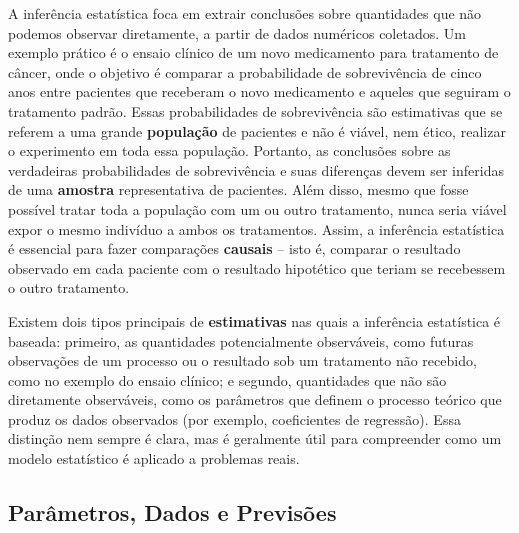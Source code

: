 A inferência estatística foca em extrair conclusões sobre quantidades que não podemos observar diretamente, a partir de dados numéricos coletados. Um exemplo prático é o ensaio clínico de um novo medicamento para tratamento de câncer, onde o objetivo é comparar a probabilidade de sobrevivência de cinco anos entre pacientes que receberam o novo medicamento e aqueles que seguiram o tratamento padrão. Essas probabilidades de sobrevivência são estimativas que se referem a uma grande \textbf{população} de pacientes e não é viável, nem ético, realizar o experimento em toda essa população. Portanto, as conclusões sobre as verdadeiras probabilidades de sobrevivência e suas diferenças devem ser inferidas de uma \textbf{amostra} representativa de pacientes. Além disso, mesmo que fosse possível tratar toda a população com um ou outro tratamento, nunca seria viável expor o mesmo indivíduo a ambos os tratamentos. Assim, a inferência estatística é essencial para fazer comparações \textbf{causais} -- isto é, comparar o resultado observado em cada paciente com o resultado hipotético que teriam se recebessem o outro tratamento.

Existem dois tipos principais de \textbf{estimativas} nas quais a inferência estatística é baseada: primeiro, as quantidades potencialmente observáveis, como futuras observações de um processo ou o resultado sob um tratamento não recebido, como no exemplo do ensaio clínico; e segundo, quantidades que não são diretamente observáveis, como os parâmetros que definem o processo teórico que produz os dados observados (por exemplo, coeficientes de regressão). Essa distinção nem sempre é clara, mas é geralmente útil para compreender como um modelo estatístico é aplicado a problemas reais.

\subsection{Parâmetros, Dados e Previsões}

